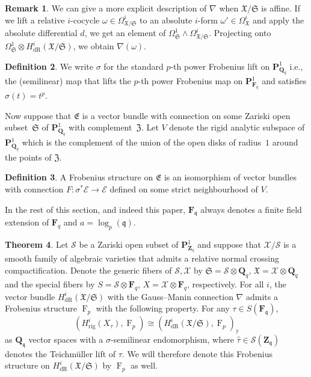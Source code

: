 \documentclass[a4paper,11pt]{article}
\numberwithin{equation}{section}
\newcommand{\ZZ}{\mathbf{Z}} %
\newcommand{\QQ}{\mathbf{Q}} %
\newcommand{\FF}{\mathbf{F}} %
\DeclareMathOperator{\Frob}{F}           %
\providecommand{\HdR}{H_{\text{dR}}}    %
\providecommand{\Hrig}{H_{\text{rig}}}  %
\theoremstyle{definition}
\newtheorem{thm}{Theorem}[section]
\newtheorem{defn}[thm]{Definition}
\newtheorem{rem}[thm]{Remark}
\begin{document}
\begin{rem}
We can give a more explicit description of $\nabla$ when $\mathfrak{X}/\mathfrak{S}$ is affine. If we lift a 
relative $i$-cocycle $\omega \in \Omega^i_{\mathfrak{X}/\mathfrak{S}}$ to an absolute $i$-form 
$\omega' \in \Omega^i_{\mathfrak{X}}$ and apply the absolute differential $d$, we get an element of 
$\Omega^1_{\mathfrak{S}} \wedge \Omega^i_{\mathfrak{X}/\mathfrak{S}}$. Projecting onto 
$\Omega^1_{\mathfrak{S}} \otimes \HdR^i(\mathfrak{X}/\mathfrak{S})$, we obtain $\nabla(\omega)$. 
\end{rem}

\begin{defn}
We write $\sigma$ for the standard $p$-th power Frobenius lift on $\mathbf{P}^1_{\QQ_q}$ i.e., 
the (semilinear) map that lifts the $p$-th power Frobenius map on $\mathbf{P}^1_{\FF_q}$ and
satisfies $\sigma(t)=t^p$. 
\end{defn}

Now suppose that $\mathfrak{E}$ is a vector bundle with connection on 
some Zariski open subset~$\mathfrak{S}$ of $\mathbf{P}^1_{\QQ_q}$ with 
complement~$\mathfrak{Z}$. Let $V$ denote the rigid analytic subspace 
of $\mathbf{P}^1_{\QQ_q}$ which is the complement of the union of the 
open disks of radius~$1$ around the points of $\mathfrak{Z}$.

\begin{defn}
A Frobenius structure on $\mathfrak{E}$ is an isomorphism of vector bundles with connection 
$F:\sigma^* \mathcal{E} \rightarrow \mathcal{E}$ defined on some strict neighbourhood of $V$. 
\end{defn}

In the rest of this section, and indeed this paper, $\FF_{\mathfrak{q}}$ always
denotes a finite field extension of $\FF_q$ and $a=\log_p(\mathfrak{q})$.

\begin{thm} \label{thm:frobstruc}
Let $\mathcal{S}$ be a Zariski open subset of $\mathbf{P}^1_{\ZZ_q}$ and suppose that 
$\mathcal{X}/\mathcal{S}$ is a smooth family of algebraic varieties that admits a relative
normal crossing compactification. Denote the generic fibers of $\mathcal{S},\mathcal{X}$ by
$\mathfrak{S}=\mathcal{S} \otimes \QQ_q$, $\mathfrak{X}=\mathcal{X} \otimes \QQ_q$
and the special fibers by $S=\mathcal{S} \otimes \FF_q$, $X=\mathcal{X} \otimes \FF_q$, respectively.
For all $i$, the vector bundle $\HdR^i(\mathfrak{X}/\mathfrak{S})$ with the
Gauss--Manin connection $\nabla$ admits a Frobenius structure $\Frob_p$ with the following property.
For any $\tau \in S(\FF_{\mathfrak{q}})$,
\[
(\Hrig^i(X_{\tau}),\Frob_p) \cong (\HdR^i(\mathfrak{X}/\mathfrak{S}),\Frob_p)_{\hat{\tau}}
\] 
as $\QQ_{\mathfrak{q}}$ vector spaces with a $\sigma$-semilinear endomorphism, where 
$\hat{\tau} \in \mathcal{S}(\ZZ_{\mathfrak{q}})$ denotes the Teichm\"uller lift of $\tau$. 
We will therefore denote this Frobenius structure on $\HdR^i(\mathfrak{X}/\mathfrak{S})$ by $\Frob_p$ 
as well.
\end{thm}
\end{document}
